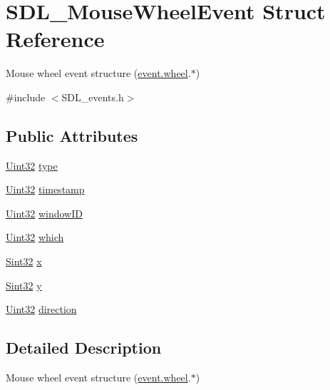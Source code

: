 \hypertarget{struct_s_d_l___mouse_wheel_event}{}\section{S\+D\+L\+\_\+\+Mouse\+Wheel\+Event Struct Reference}
\label{struct_s_d_l___mouse_wheel_event}


Mouse wheel event structure (\hyperlink{union_s_d_l___event_a267d3f550715519ec90a81ccd0e6cbda}{event.\+wheel}.$\ast$)  




{\ttfamily \#include $<$S\+D\+L\+\_\+events.\+h$>$}

\subsection*{Public Attributes}
\begin{DoxyCompactItemize}
\item 
\hyperlink{_s_d_l__stdinc_8h_add440eff171ea5f55cb00c4a9ab8672d}{Uint32} \hyperlink{struct_s_d_l___mouse_wheel_event_aa6b741e99df708c6f9550ee0f520fb70}{type}
\item 
\hyperlink{_s_d_l__stdinc_8h_add440eff171ea5f55cb00c4a9ab8672d}{Uint32} \hyperlink{struct_s_d_l___mouse_wheel_event_a83ad52c80ff49a8e75dc6c33bba65fa0}{timestamp}
\item 
\hyperlink{_s_d_l__stdinc_8h_add440eff171ea5f55cb00c4a9ab8672d}{Uint32} \hyperlink{struct_s_d_l___mouse_wheel_event_ab45eb1895217214ecb773fc555e08f6c}{window\+ID}
\item 
\hyperlink{_s_d_l__stdinc_8h_add440eff171ea5f55cb00c4a9ab8672d}{Uint32} \hyperlink{struct_s_d_l___mouse_wheel_event_a014dc767d52e8b75ba26a5f12e1704e8}{which}
\item 
\hyperlink{_s_d_l__stdinc_8h_a7a90b941db9d4582e9ad7abb9940ff7e}{Sint32} \hyperlink{struct_s_d_l___mouse_wheel_event_a6d904eef474ea45a5b1828fcb5b0f859}{x}
\item 
\hyperlink{_s_d_l__stdinc_8h_a7a90b941db9d4582e9ad7abb9940ff7e}{Sint32} \hyperlink{struct_s_d_l___mouse_wheel_event_a53fdf77a464426bc8b30e629795f044b}{y}
\item 
\hyperlink{_s_d_l__stdinc_8h_add440eff171ea5f55cb00c4a9ab8672d}{Uint32} \hyperlink{struct_s_d_l___mouse_wheel_event_a9fc46552d116499e5b8ca89d66df932c}{direction}
\end{DoxyCompactItemize}


\subsection{Detailed Description}
Mouse wheel event structure (\hyperlink{union_s_d_l___event_a267d3f550715519ec90a81ccd0e6cbda}{event.\+wheel}.$\ast$) 

